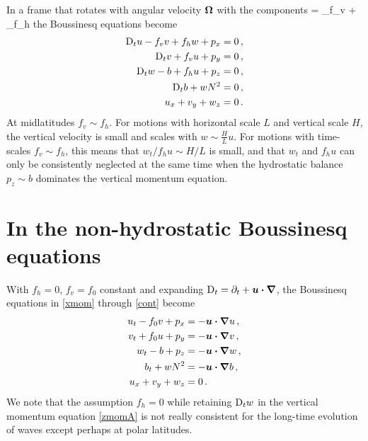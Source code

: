 \documentclass[12pt, oneside]{book}
\begin{document}
In a frame that rotates with angular velocity $\boldsymbol{\Omega}$ with the components
 \bOmega = \underbrace{ \mystrut{1ex} 2 \Omega \sin \phi }_{ f_v} \bzh + \underbrace{ \mystrut{1ex}2 \Omega \cos \phi}_{ f_h} \byh \com
\eeq
the Boussinesq equations become
\begin{align}
\mathrm{D}_t u - f_v v + f_h w + p_x &= 0 \, , \label{xmomFull} \\
\mathrm{D}_t v + f_v u + p_y &= 0 \, , \label{ymomFull} \\
\mathrm{D}_t w - b + f_h u + p_z &= 0 \, , \label{zmomFull} \\
\mathrm{D}_t b + w N^2 &= 0 \, , \label{buoyFull} \\
u_x + v_y + w_z &= 0 \, . \label{contFull}
\end{align}
At midlatitudes $f_v \sim f_h$.  For motions with horizontal scale $L$ and vertical scale $H$, the vertical velocity is small and scales with $w \sim \tfrac{H}{L} u$.  For motions with time-scales $f_v \sim f_h$, this means that $w_t / f_h u \sim H/L$ is small, and that $w_t$ and $f_h u$ can only be consistently neglected at the same time when the hydrostatic balance $p_z \sim b$ dominates the vertical momentum equation.  

\section{In the non-hydrostatic Boussinesq equations}
\label{nonhydrostaticDerivationA}

With $f_h = 0$, $f_v = f_0$ constant and expanding $\mathrm{D}_t = \partial_t + \boldsymbol u \boldsymbol \cdot \boldsymbol \nabla$, the Boussinesq equations in \eqref{xmom} through \eqref{cont} become
\begin{align}
u_t - f_0 v + p_x &= - \boldsymbol u \boldsymbol \cdot \boldsymbol \nabla u \, , \label{xmomA} \\
v_t + f_0 u + p_y &= - \boldsymbol u \boldsymbol \cdot \boldsymbol \nabla v \, , \label{ymomA} \\
w_t - b  + p_z &= - \boldsymbol u \boldsymbol \cdot \boldsymbol \nabla w \, , \label{zmomA} \\
b_t + w N^2 &= - \boldsymbol u \boldsymbol \cdot \boldsymbol \nabla b \, , \label{buoyA} \\
u_x + v_y + w_z &= 0 \, . \label{contA}
\end{align}
We note that the assumption $f_h = 0$ while retaining $\mathrm{D}_t w$ in the vertical momentum equation \eqref{zmomA} is not really consistent for the long-time evolution of waves except perhaps at polar latitudes. 
\end{document}
